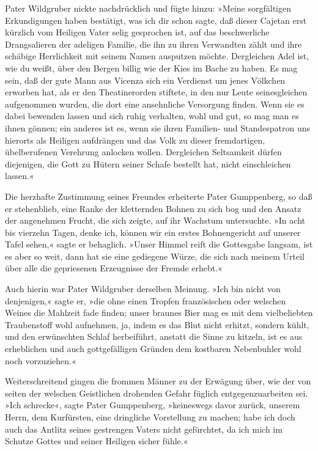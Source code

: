 Pater Wildgruber nickte nachdrücklich und fügte hinzu: »Meine
sorgfältigen Erkundigungen haben bestätigt, was ich dir schon
sagte, daß dieser Cajetan erst kürzlich vom Heiligen Vater selig
gesprochen ist, auf das beschwerliche Drangsalieren der adeligen
Familie, die ihn zu ihren Verwandten zählt und ihre schäbige
Herrlichkeit mit seinem Namen ausputzen möchte. Dergleichen Adel
ist, wie du weißt, über den Bergen billig wie der Kies im Bache zu
haben. Es mag sein, daß der gute Mann aus Vicenza sich ein
Verdienst um jenes Völkchen erworben hat, als er den Theatinerorden
stiftete, in den nur Leute seinesgleichen aufgenommen wurden, die
dort eine ansehnliche Versorgung finden. Wenn sie es dabei bewenden
lassen und sich ruhig verhalten, wohl und gut, so mag man es ihnen
gönnen;\pagenum{[97]} ein anderes ist es, wenn sie ihren Familien-
und Standespatron uns hierorts als Heiligen aufdrängen und das Volk
zu dieser fremdartigen, übelberufenen Verehrung anlocken wollen.
Dergleichen Seltsamkeit dürfen diejenigen, die Gott zu Hütern
seiner Schafe bestellt hat, nicht einschleichen lassen.«

Die herzhafte Zustimmung seines Freundes erheiterte Pater
Gumppenberg, so daß er stehenblieb, eine Ranke der kletternden
Bohnen zu sich bog und den Ansatz der angenehmen Frucht, die sich
zeigte, auf ihr Wachstum untersuchte. »In acht bis vierzehn Tagen,
denke ich, können wir ein erstes Bohnengericht auf unserer Tafel
sehen,« sagte er behaglich. »Unser Himmel reift die Gottesgabe
langsam, ist es aber so weit, dann hat sie eine gediegene Würze,
die sich nach meinem Urteil über alle die gepriesenen Erzeugnisse
der Fremde erhebt.«

Auch hierin war Pater Wildgruber derselben Meinung. »Ich bin nicht
von denjenigen,« sagte er, »die ohne einen Tropfen französischen
oder welschen Weines die Mahlzeit fade finden; unser braunes Bier
mag es mit dem vielbeliebten Traubenstoff wohl aufnehmen, ja, indem
es das Blut nicht erhitzt, sondern kühlt, und den erwünschten
Schlaf herbeiführt, anstatt die Sinne zu kitzeln, ist es aus
erheblichen und auch gottgefälligen Gründen dem kostbaren
Nebenbuhler wohl noch vorzuziehen.«

Weiterschreitend gingen die frommen Männer zu der Erwägung über,
wie der von seiten der welschen Geistlichen drohenden Gefahr
füglich entgegenzuarbeiten sei. »Ich schrecke«, sagte Pater
Gumppenberg, »keineswegs davor zurück, unserem Herrn, dem
Kurfürsten, eine dringliche Vorstellung zu machen; habe ich doch
auch das Antlitz seines gestrengen Vaters nicht\pagenum{[98]}
gefürchtet, da ich mich im Schutze Gottes und seiner Heiligen
sicher fühle.«

